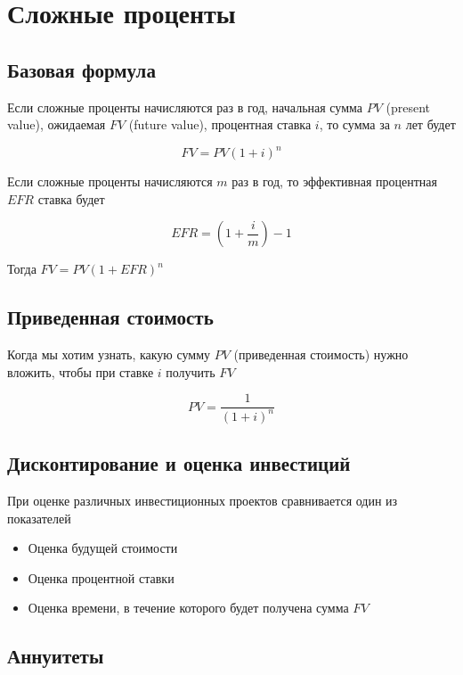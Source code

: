 \section{Сложные проценты}

\subsection{Базовая формула}

Если сложные проценты начисляются раз в год, начальная сумма $ PV $ (present value), ожидаемая $ FV $ (future value), процентная ставка $ i $, то сумма за $ n $ лет будет

$$
FV = PV(1 + i)^{n}
$$

Если сложные проценты начисляются $ m $ раз в год, то эффективная процентная $ EFR $ ставка будет

$$ 
EFR = (1 + \dfrac{i}{m}) - 1
$$

Тогда $ FV = PV(1 + EFR)^{n} $

\subsection{Приведенная стоимость}



Когда мы хотим узнать, какую сумму $ PV $ (приведенная стоимость) нужно вложить, чтобы при ставке $ i $ получить $ FV $

$$
PV = \dfrac{1}{(1+i)^{n}}
$$

\subsection{Дисконтирование и оценка инвестиций}

При оценке различных инвестиционных проектов сравнивается один из показателей

\begin{itemize}
\item 
Оценка будущей стоимости

\item 
Оценка процентной ставки

\item 
Оценка времени, в течение которого будет получена сумма $ FV $

\end{itemize}

\subsection{Аннуитеты}

